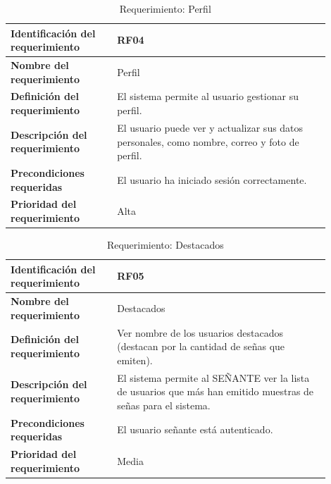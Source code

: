 \begin{table}[H]
    \centering
    \begin{tabular}{|p{0.3\linewidth}|p{0.6\linewidth}|}
        \hline
        \textbf{Identificación del requerimiento} & RF04 \\
        \hline
        \textbf{Nombre del requerimiento} & Perfil \\
        \hline
        \textbf{Definición del requerimiento} & El sistema permite al usuario gestionar su perfil. \\
        \hline
        \textbf{Descripción del requerimiento} & El usuario puede ver y actualizar sus datos personales, como nombre, correo y foto de perfil. \\
        \hline
        \textbf{Precondiciones requeridas} & El usuario ha iniciado sesión correctamente. \\
        \hline
        \textbf{Prioridad del requerimiento} & Alta \\
        \hline
    \end{tabular}
    \caption{Requerimiento: Perfil}
    \label{tab:rf-perfil}
\end{table}

\begin{table}[H]
    \centering
    \begin{tabular}{|p{0.3\linewidth}|p{0.6\linewidth}|}
        \hline
        \textbf{Identificación del requerimiento} & RF05 \\
        \hline
        \textbf{Nombre del requerimiento} & Destacados \\
        \hline
        \textbf{Definición del requerimiento} & Ver nombre de los usuarios destacados (destacan por la cantidad de señas que emiten). \\
        \hline
        \textbf{Descripción del requerimiento} & El sistema permite al SEÑANTE ver la lista de usuarios que más han emitido muestras de señas para el sistema. \\
        \hline
        \textbf{Precondiciones requeridas} & El usuario señante está autenticado. \\
        \hline
        \textbf{Prioridad del requerimiento} & Media \\
        \hline
    \end{tabular}
    \caption{Requerimiento: Destacados}
    \label{tab:rf-destacados-revision}
\end{table}

